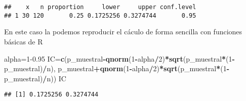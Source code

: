 \documentclass[
]{article}
\newenvironment{Shaded}{\begin{snugshade}}{\end{snugshade}}
\newcommand{\DecValTok}[1]{\textcolor[rgb]{0.00,0.00,0.81}{#1}}
\newcommand{\FloatTok}[1]{\textcolor[rgb]{0.00,0.00,0.81}{#1}}
\newcommand{\KeywordTok}[1]{\textcolor[rgb]{0.13,0.29,0.53}{\textbf{#1}}}
\newcommand{\NormalTok}[1]{#1}
\newcommand{\OperatorTok}[1]{\textcolor[rgb]{0.81,0.36,0.00}{\textbf{#1}}}
\begin{document}
\begin{verbatim}
##    x   n proportion     lower     upper conf.level
## 1 30 120       0.25 0.1725256 0.3274744       0.95
\end{verbatim}

En este caso la podemos reproducir el cáculo de forma sencilla con
funciones básicas de R

\begin{Shaded}
\begin{Highlighting}[]
\NormalTok{alpha=}\DecValTok{1}\FloatTok{{-}0.95}
\NormalTok{IC=}\KeywordTok{c}\NormalTok{(p\_muestral}\OperatorTok{{-}}\KeywordTok{qnorm}\NormalTok{(}\DecValTok{1}\OperatorTok{{-}}\NormalTok{alpha}\OperatorTok{/}\DecValTok{2}\NormalTok{)}\OperatorTok{*}\KeywordTok{sqrt}\NormalTok{(p\_muestral}\OperatorTok{*}\NormalTok{(}\DecValTok{1}\OperatorTok{{-}}\NormalTok{p\_muestral)}\OperatorTok{/}\NormalTok{n),}
\NormalTok{     p\_muestral}\OperatorTok{+}\KeywordTok{qnorm}\NormalTok{(}\DecValTok{1}\OperatorTok{{-}}\NormalTok{alpha}\OperatorTok{/}\DecValTok{2}\NormalTok{)}\OperatorTok{*}\KeywordTok{sqrt}\NormalTok{(p\_muestral}\OperatorTok{*}\NormalTok{(}\DecValTok{1}\OperatorTok{{-}}\NormalTok{p\_muestral)}\OperatorTok{/}\NormalTok{n))}
\NormalTok{IC}
\end{Highlighting}
\end{Shaded}

\begin{verbatim}
## [1] 0.1725256 0.3274744
\end{verbatim}
\end{document}
